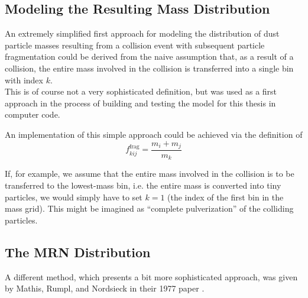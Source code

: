     \subsection{Modeling the Resulting Mass Distribution}
    \label{sec:modeling_the_mass_distribution_resulting_from_fragmentation}

        An extremely simplified first approach for modeling the distribution of dust particle
        masses resulting from a collision event with subsequent particle fragmentation could 
        be derived from the
        naive assumption that, as a result of a collision, the entire mass involved in the
        collision is transferred into a single bin with index $k$. \\

        This is of course not a very sophisticated definition, but was used as a first 
        approach in the process of building and testing the model for this thesis in 
        computer code.

        \clearpage

        An implementation of this simple approach could be achieved via the definition of
        \begin{equation}
            f^\text{frag}_{kij} = \frac{m_i + m_j}{m_k}
        \end{equation}

        If, for example, we assume that the entire mass involved in the collision is to be
        transferred to the lowest-mass bin, i.e. the entire mass is converted into tiny particles,
        we would simply have to set $k=1$ (the index of the first bin in the mass grid).
        This might be imagined as ``complete pulverization'' of the colliding particles.



    \subsection{The MRN Distribution}
    \label{sec:the_mrn_distribution}
        
        A different method, which presents a bit more sophisticated approach, was given by 
        Mathis, Rumpl, and Nordsieck in their 1977 paper \cite{mathis_rumpl_nordsieck_1977}. \\

